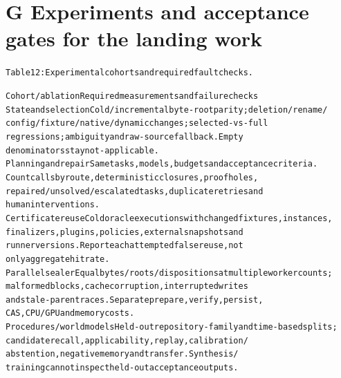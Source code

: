 \section*{G Experiments and acceptance gates for the landing work}

\begingroup\fontsize{7}{8.4}\selectfont
\begin{alltt}
Table 12: Experimental cohorts and required fault checks.
\end{alltt}\endgroup

\begingroup\fontsize{7}{8.4}\selectfont
\begin{alltt}
Cohort / ablation                            Required measurements and failure checks
State and selection                          Cold/incremental byte-root parity; deletion/rename/
                                             config/fixture/native/dynamic changes; selected-vs-full
                                             regressions; ambiguity and raw-source fallback. Empty
                                             denominators stay not-applicable.
Planning and repair                          Same tasks, models, budgets and acceptance criteria.
                                             Count calls by route, deterministic closures, proof holes,
                                             repaired/unsolved/escalated tasks, duplicate retries and
                                             human interventions.
Certificate reuse                            Cold oracle executions with changed fixtures, instances,
                                             finalizers, plugins, policies, external snapshots and
                                             runner versions. Report each attempted false reuse, not
                                             only aggregate hit rate.
Parallel sealer                              Equal bytes/roots/dispositions at multiple worker counts;
                                             malformed blocks, cache corruption, interrupted writes
                                             and stale-parent races. Separate prepare, verify, persist,
                                             CAS, CPU/GPU and memory costs.
Procedures / world models                    Held-out repository-family and time-based splits;
                                             candidate recall, applicability, replay, calibration/
                                             abstention, negative memory and transfer. Synthesis/
                                             training cannot inspect held-out acceptance outputs.

\end{alltt}
